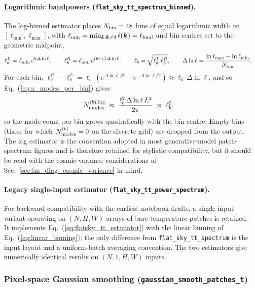 \documentclass[11pt]{article}
\theoremstyle{definition}
\begin{document}
\paragraph{Logarithmic bandpowers (\texttt{flat\_sky\_tt\_spectrum\_binned}).} The log-binned estimator places $N_{\rm bin}=48$ bins of equal logarithmic width on $[\ell_{\min},\ell_{\max}]$, with $\ell_{\min}=\min_{\bm k:\bm k\neq 0}\ell(\bm k)=\ell_{\rm fund}$ and bin centres set to the geometric midpoint,
\begin{equation}
  \ell_b^L=\ell_{\min}\,e^{b\,\Delta\ln\ell},\qquad
  \ell_b^R=\ell_{\min}\,e^{(b+1)\,\Delta\ln\ell},\qquad
  \ell_b=\sqrt{\ell_b^L\,\ell_b^R},\qquad
  \Delta\ln\ell=\frac{\ln\ell_{\max}-\ln\ell_{\min}}{N_{\rm bin}}.
  \label{eq:log_binning}
\end{equation}
For each bin, $\ell_b^R-\ell_b^L=\ell_b\,(e^{\Delta\ln\ell/2}-e^{-\Delta\ln\ell/2})\approx \ell_b\,\Delta\ln\ell$, and so Eq.~(\ref{eq:n_modes_per_bin}) gives
\begin{equation}
  N^{(b),{\rm log}}_{\rm modes}\;\approx\;\frac{\ell_b^2\,\Delta\ln\ell\,L^2}{2\pi}
  \;\propto\;\ell_b^2,
\end{equation}
so the mode count per bin grows quadratically with the bin centre. Empty bins (those for which $N^{(b)}_{\rm modes}=0$ on the discrete grid) are dropped from the output. The log estimator is the convention adopted in most generative-model patch-spectrum figures and is therefore retained for stylistic compatibility, but it should be read with the cosmic-variance considerations of Sec.~\ref{sec:fm_diag_cosmic_variance} in mind.

\paragraph{Legacy single-input estimator (\texttt{flat\_sky\_tt\_power\_spectrum}).} For backward compatibility with the earliest notebook drafts, a single-input variant operating on $(N,H,W)$ arrays of bare temperature patches is retained. It implements Eq.~(\ref{eq:flatsky_tt_estimator}) with the linear binning of Eq.~(\ref{eq:linear_binning}); the only difference from \texttt{flat\_sky\_tt\_spectrum} is the input layout and a uniform-batch averaging convention. The two estimators give numerically identical results on $(N,1,H,W)$ inputs.
\subsubsection{Pixel-space Gaussian smoothing (\texttt{gaussian\_smooth\_patches\_t})}
\label{sec:fm_diag_smoothing}
\end{document}
